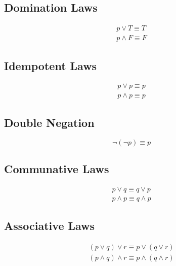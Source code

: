 \documentclass[12pt]{article}
\begin{document}
\subsection{Domination Laws}

\begin{subequations}\label{domination}
\begin{align}
p \lor T \equiv T\label{dom_first}\\
p \wedge F \equiv F\label{dom_second}
\end{align}
\end{subequations}

\subsection{Idempotent Laws}

\begin{subequations}\label{indempotent}
\begin{align}
p \lor p \equiv p\label{indem_first}\\
p \wedge p \equiv p\label{idem_second}
\end{align}
\end{subequations}

\subsection{Double Negation}

\begin{equation}
\neg (\neg p) \equiv p
\end{equation}

\subsection{Communative Laws}

\begin{subequations}\label{communative}
\begin{align}
p \lor q \equiv q \lor p\label{comm_first}\\
p \wedge p \equiv q \wedge p\label{comm_second}
\end{align}
\end{subequations}

\subsection{Associative Laws}

\begin{subequations}\label{associative}
\begin{align}
(p \lor q) \lor r \equiv p \lor (q \lor r)\label{ass_first}\\
(p \wedge q) \wedge r \equiv p \wedge (q \wedge r)\label{ass_second}
\end{align}
\end{subequations}
\end{document}
